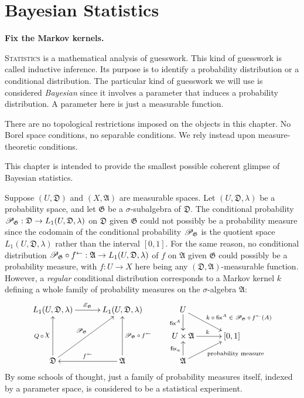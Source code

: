 \documentclass[
twoside=true,
paper=letter,
fontsize=9pt,
pagesize=auto,
leqno,
openany,
headsepline,
overfullrule,
]{scrbook}
\theoremstyle{plain}
\theoremstyle{plain}
\theoremstyle{definition}
\theoremstyle{bfnoteitalic}
\theoremstyle{bfnoteroman}
\newcommand{\sigalg}[1]{\mathfrak{#1}}
\newcommand{\cali}[1]{\mathscr{#1}}
\newcommand{\sfop}[1]{\mathsf{#1}}
\newcommand{\condexpop}[1]{\mathop{\cali{E}\hspace{-1pt}}\nolimits_{#1}}
\newcommand{\condprobop}[1]{\mathop{\cali{P}\hspace{-1pt}}\nolimits_{#1}}
\newcommand{\textsigma}{\hbox{\large{$\sigma$}}\kern-1pt}
\newcommand{\charfunction}[1]{\mathop{{\raisebox{2pt}{$\chi$}}_{#1}}}
\newcommand{\preimage}[1]{\mathop{#1^{\leftarrow}}}
\newcommand{\sigmaalgebra}{\sigalg{A}}
\newcommand{\funcf}{f}
\newcommand{\funck}{k}
\newcommand{\measurespace}{X}
\newcommand{\measlambda}{\lambda}
\newcommand{\seti}{A}
\newcommand{\fixinthefirst}[1]{\sfop{fix}_{#1}}
\newcommand{\fixinthesecond}[1]{\sfop{fix}^{#1}}
\newcommand{\uspace}{U}%
\newcommand{\uspaceelt}{u}
\newcommand{\uspacesig}{\sigalg{D}}
\begin{document}
\chapter{Bayesian Statistics}\label{bayesian_statistics}
\textbf{Fix the Markov kernels.}

\lettrine{S}{tatistics} is a mathematical analysis of guesswork. This kind of guesswork is called inductive inference.
Its purpose is to identify a probability distribution or a conditional distribution. The particular kind of guesswork we will use is considered \emph{Bayesian} since it involves a parameter that induces a  probability distribution. A parameter here is just a measurable function.

There are no topological restrictions imposed on the objects in this chapter. No Borel space conditions, no separable conditions.  We rely instead upon measure-theoretic conditions.

This chapter is intended to provide the smallest possible coherent glimpse of Bayesian statistics.

Suppose
$(\uspace, \uspacesig)$ and
$(\measurespace, \sigmaalgebra)$ are measurable spaces.
Let
$(\uspace,\uspacesig,\measlambda)$
be a probability space, and let $\sigalg{G}$ be a \textsigma-subalgebra of
$\uspacesig$.
The conditional probability
$
\condprobop{\sigalg{G}}:
\uspacesig \to
L_1(\uspace,\uspacesig,\measlambda)
$
on $\uspacesig$ given $\sigalg{G}$
could not possibly be a probability measure since the  codomain
of the conditional probability $\condprobop{\sigalg{G}}$ is the quotient space
$L_1(\uspace,\uspacesig,\measlambda)$ rather than the interval $[0,1]$.
For the same reason, no conditional distribution
${\condprobop{\sigalg{G}}}\circ \preimage{\funcf}
: \sigmaalgebra \to L_1(\uspace,\uspacesig,\measlambda)$
of $\funcf$ on $\sigmaalgebra$ given $\sigalg{G}$
could possibly be a probability measure,
with $\funcf:\uspace\to\measurespace$ here being any
$(\uspacesig,\sigmaalgebra)$\hyp{}measurable function.
However, a \emph{regular} conditional distribution corresponds to a Markov kernel $\funck$ defining a whole family of probability measures on the
\textsigma-algebra $\sigmaalgebra$:
\[
\xymatrix@R=16pt@C=30pt{
L_1(\uspace,\uspacesig,\measlambda)
\ar[r]^{\condexpop{\sigalg{G}}}
& L_1(\uspace,\uspacesig,\measlambda)
& \uspace
\ar[d]_-{\fixinthesecond{\seti}}
\ar[dr]^{\qquad\text{$\funck\circ\fixinthesecond{\seti} \in \condprobop{\sigalg{G}}\circ \preimage{\funcf}(\seti)$}}
\\
&
& \uspace\times\sigmaalgebra \ar[r]^{\funck}
& [0,1]
\\
\uspacesig
\ar[uu]^{Q\,\circ\, \charfunction{}}
\ar[uur]^{\condprobop{\sigalg{G}}}
& \sigmaalgebra
\ar[uu]_{\condprobop{\sigalg{G}}\circ \preimage{\funcf}}
\ar[l]_{\preimage{\funcf}}
& \sigmaalgebra
\ar[ur]_{\qquad\text{probability measure}}
\ar[u]^{\fixinthefirst{\uspaceelt}}
&
\\
}
\]
By some schools of thought, just a family
of probability measures itself, indexed by a parameter space, is considered to be a statistical experiment.
\end{document}
